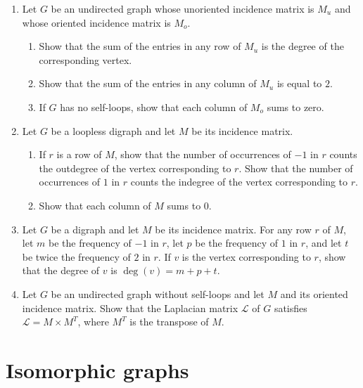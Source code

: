\begin{enumerate}
\item Let $G$ be an undirected graph whose unoriented incidence matrix
  is $M_u$ and whose oriented incidence matrix is $M_o$.
  \begin{enumerate}
  \item Show that the sum of the entries in any row of $M_u$ is the
    degree of the corresponding vertex.

  \item Show that the sum of the entries in any column of $M_u$ is
    equal to $2$.

  \item If $G$ has no self-loops, show that each column of $M_o$ sums
    to zero.
  \end{enumerate}

\item Let $G$ be a loopless digraph and let $M$ be its incidence
  matrix.
  \begin{enumerate}
  \item If $r$ is a row of $M$, show that the number of occurrences of
    $-1$ in $r$ counts the outdegree of the vertex corresponding to
    $r$. Show that the number of occurrences of $1$ in $r$ counts the
    indegree of the vertex corresponding to $r$.

  \item Show that each column of $M$ sums to $0$.
  \end{enumerate}

\item Let $G$ be a digraph and let $M$ be its incidence matrix. For
  any row $r$ of $M$, let $m$ be the frequency of $-1$ in $r$, let
  $p$ be the frequency of $1$ in $r$, and let $t$ be twice the
  frequency of $2$ in $r$. If $v$ is the vertex corresponding to
  $r$, show that the degree of $v$ is $\deg(v) = m + p + t$.

\item Let $G$ be an undirected graph without self-loops and let $M$
  and its oriented incidence matrix. Show that the Laplacian matrix
  $\mathcal{L}$ of $G$ satisfies $\mathcal{L} = M \times M^T$, where
  $M^T$ is the transpose of $M$.
\end{enumerate}



\section{Isomorphic graphs}
\label{chap:introduction:isomorphic_graphs}

